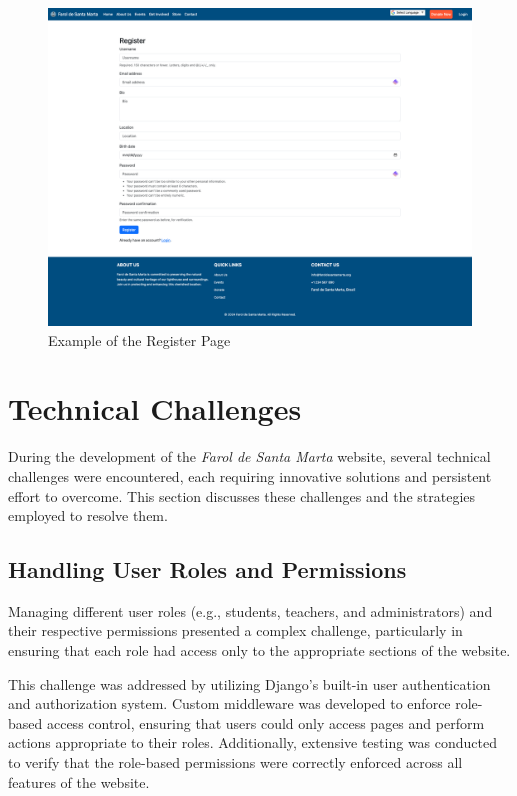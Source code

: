 \begin{figure}[H]
    \centering
    \includegraphics[width=\textwidth]{images/register-page.png}
    \caption{Example of the Register Page}
    \label{fig:register_page}
\end{figure}

\section{Technical Challenges}

During the development of the \textit{Farol de Santa Marta} website, several technical challenges were encountered, each requiring innovative solutions and persistent effort to overcome. This section discusses these challenges and the strategies employed to resolve them.

\subsection{Handling User Roles and Permissions}

Managing different user roles (e.g., students, teachers, and administrators) and their respective permissions presented a complex challenge, particularly in ensuring that each role had access only to the appropriate sections of the website.

This challenge was addressed by utilizing Django’s built-in user authentication and authorization system. Custom middleware was developed to enforce role-based access control, ensuring that users could only access pages and perform actions appropriate to their roles. Additionally, extensive testing was conducted to verify that the role-based permissions were correctly enforced across all features of the website.

